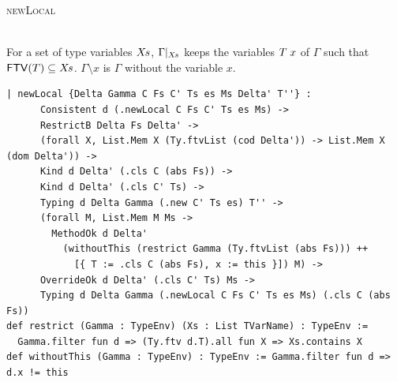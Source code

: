 \begin{cmp}{\textsc{newLocal}}
\begin{paperside}
\\[1ex]
For a set of type variables $X\mkern-2mu s$, $\Gamma|_{X\mkern-2mu s}$ keeps the variables $T\mskip5mu x$ of $\Gamma$ such that $\mathsf{FTV}(T)\subseteq X\mkern-2mu s$.
$\Gamma\setminus x$ is $\Gamma$ without the variable $x$.
\end{paperside}
\begin{leanside}
\begin{lstlisting}[style=leanside]
  | newLocal {Delta Gamma C Fs C' Ts es Ms Delta' T''} :
      Consistent d (.newLocal C Fs C' Ts es Ms) ->
      RestrictB Delta Fs Delta' ->
      (forall X, List.Mem X (Ty.ftvList (cod Delta')) -> List.Mem X (dom Delta')) ->
      Kind d Delta' (.cls C (abs Fs)) ->
      Kind d Delta' (.cls C' Ts) ->
      Typing d Delta Gamma (.new C' Ts es) T'' ->
      (forall M, List.Mem M Ms ->
        MethodOk d Delta'
          (withoutThis (restrict Gamma (Ty.ftvList (abs Fs))) ++
            [{ T := .cls C (abs Fs), x := this }]) M) ->
      OverrideOk d Delta' (.cls C' Ts) Ms ->
      Typing d Delta Gamma (.newLocal C Fs C' Ts es Ms) (.cls C (abs Fs))
def restrict (Gamma : TypeEnv) (Xs : List TVarName) : TypeEnv :=
  Gamma.filter fun d => (Ty.ftv d.T).all fun X => Xs.contains X
def withoutThis (Gamma : TypeEnv) : TypeEnv := Gamma.filter fun d => d.x != this
\end{lstlisting}
\end{leanside}
\end{cmp}

